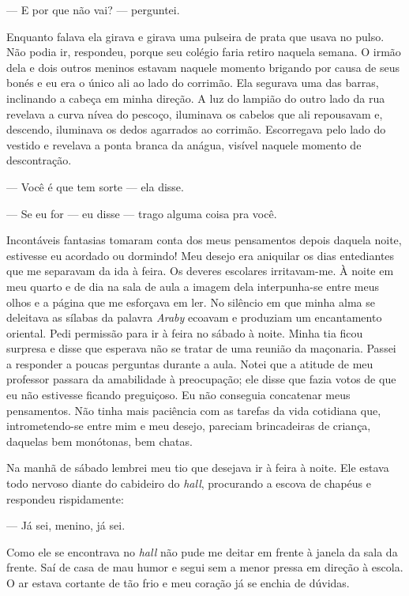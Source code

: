--- E por que não vai? --- perguntei.

Enquanto falava ela girava e girava uma pulseira de prata que usava no
pulso.  Não podia ir, respondeu, porque seu colégio faria retiro naquela
semana.  O irmão dela e dois outros meninos estavam naquele momento brigando
por causa de seus bonés e eu era o único ali ao lado do corrimão.  Ela segurava
uma das barras, inclinando a cabeça em minha direção.  A luz do lampião do
outro lado da rua revelava a curva nívea do pescoço, iluminava os cabelos que
ali repousavam e, descendo, iluminava os dedos agarrados ao corrimão.
Escorregava pelo lado do vestido e revelava a ponta branca da anágua, visível
naquele momento de descontração.

--- Você é que tem sorte --- ela disse.

--- Se eu for --- eu disse --- trago alguma coisa pra você.

Incontáveis fantasias tomaram conta dos meus pensamentos depois daquela noite,
estivesse eu acordado ou dormindo!  Meu desejo era aniquilar os dias
entediantes que me separavam da ida à feira.  Os deveres escolares
irritavam-me.  À noite em meu quarto e de dia na sala de aula a imagem dela
interpunha-se entre meus olhos e a página que me esforçava em ler.  No silêncio
em que minha alma se deleitava as sílabas da palavra \textit{Araby} ecoavam e
produziam um encantamento oriental.  Pedi permissão para ir à feira no sábado à
noite.  Minha tia ficou surpresa e disse que esperava não se tratar de uma
reunião da maçonaria.  Passei a responder a poucas perguntas durante a aula.
Notei que a atitude de meu professor passara da amabilidade à preocupação; ele
disse que fazia votos de que eu não estivesse ficando preguiçoso.  Eu não
conseguia concatenar meus pensamentos.  Não tinha mais paciência com as tarefas
da vida cotidiana que, intrometendo-se entre mim e meu desejo, pareciam
brincadeiras de criança, daquelas bem monótonas, bem chatas.

Na manhã de sábado lembrei meu tio que desejava ir à feira à noite.  Ele estava
todo nervoso diante do cabideiro do \textit{hall}, procurando a escova de
chapéus e respondeu rispidamente:

--- Já sei, menino, já sei.

Como ele se encontrava no \textit{hall} não pude me deitar em frente à janela
da sala da frente.  Saí de casa de mau humor e segui sem a menor pressa em
direção à escola.  O ar estava cortante de tão frio e meu coração já se enchia
de dúvidas.

